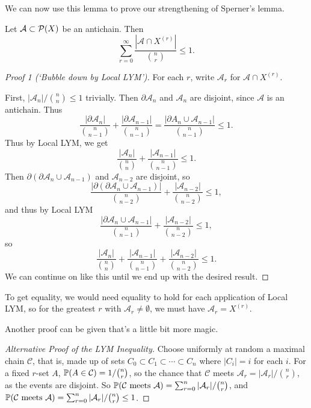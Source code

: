 \documentclass[a4paper]{scrartcl}
\newcommand{\A}{\mathcal{A}}
\begin{document}
We can now use this lemma to prove our strengthening of Sperner's lemma.

\begin{theorem}
    Let $\A \subset \power(X)$ be an antichain. Then
    $$
\sum_{r = 0}^{\infty} \frac{|\A \cap X^{(r)}|}{\binom{n}{r}} \leq 1.
    $$
\end{theorem}
\begin{proof}[Proof 1 (`Bubble down by Local LYM')]
    For each $r$, write $\A_r$ for $\A \cap X^{(r)}$.
    
    First, $|\A_n| / \binom{n}{n} \leq 1$ trivially. Then $\partial \A_n$ and $\A_n$ are disjoint, since $\A$ is an antichain. Thus
    $$
    \frac{|\partial \A_n|}{\binom{n}{n - 1}} + \frac{|\partial \A_{n - 1}|}{\binom{n}{n - 1}} = \frac{|\partial A_n \cup \A_{n - 1}|}{\binom{n}{n - 1}} \leq 1.
    $$
    Thus by Local LYM, we get
    $$
    \frac{|\A_n|}{\binom{n}{n}} + \frac{|\A_{n - 1}|}{\binom{n}{n - 1}} \leq 1.
    $$
    Then $\partial(\partial \A_n \cup \A_{n - 1})$ and $\A_{n - 2}$ are disjoint, so
    $$
\frac{|\partial(\partial \A_n \cup \A_{n - 1})|}{\binom{n}{n - 2}} + \frac{|\A_{n - 2}|}{\binom{n}{n - 2}} \leq 1,
    $$
    and thus by Local LYM
    $$
    \frac{|\partial \A_n \cup \A_{n - 1}|}{\binom{n}{n - 1}} + \frac{|\A_{n - 2}|}{\binom{n}{n - 2}} \leq 1,
    $$
    so
    $$
    \frac{|\A_n|}{\binom{n}{n}} + \frac{|\A_{n - 1}|}{\binom{n}{n - 1}} + \frac{|\A_{n - 2}|}{\binom{n}{n - 2}}  \leq 1.
    $$
    We can continue on like this until we end up with the desired result.
\end{proof}
To get equality, we would need equality to hold for each application of Local LYM, so for the greatest $r$ with $\A_r \neq \emptyset$, we must have $\A_r = X^{(r)}$.

Another proof can be given that's a little bit more magic.

\begin{proof}[Alternative Proof of the LYM Inequality]
    Choose uniformly at random a maximal chain $\mathcal{C}$, that is, made up of sets $C_0 \subset C_1 \subset \cdots \subset C_n$ where $|C_i| = i$ for each $i$.
    For a fixed $r$-set $A$, $\mathbb{P}(A \in \mathcal{C}) = 1/\binom{n}{r}$, so the chance that $\mathcal{C}$ meets $\mathcal{A}_r = |\mathcal{A}_r|/\binom{n}{r}$, as the events are disjoint. So $\PP(\mathcal{C} \text{ meets } \A) = \sum_{r = 0}^n |\A_r|/\binom{n}{r}$, and $\PP(\mathcal{C} \text{ meets } \A) = \sum_{r = 0}^n |\A_r| / \binom{n}{r} \leq 1$.
\end{proof}
\end{document}
